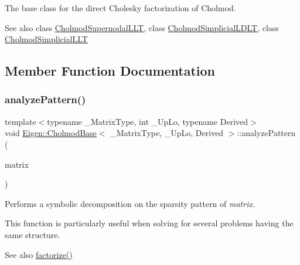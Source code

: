 The base class for the direct Cholesky factorization of Cholmod. 

\begin{DoxySeeAlso}{See also}
class \mbox{\hyperlink{class_eigen_1_1_cholmod_supernodal_l_l_t}{Cholmod\+Supernodal\+L\+LT}}, class \mbox{\hyperlink{class_eigen_1_1_cholmod_simplicial_l_d_l_t}{Cholmod\+Simplicial\+L\+D\+LT}}, class \mbox{\hyperlink{class_eigen_1_1_cholmod_simplicial_l_l_t}{Cholmod\+Simplicial\+L\+LT}} 
\end{DoxySeeAlso}


\subsection{Member Function Documentation}
\mbox{\label{class_eigen_1_1_cholmod_base_a5ac967e9f4ccfc43ca9e610b89232c24}} 
\subsubsection{\texorpdfstring{analyzePattern()}{analyzePattern()}}
{\footnotesize\ttfamily template$<$typename \+\_\+\+Matrix\+Type, int \+\_\+\+Up\+Lo, typename Derived$>$ \\
void \mbox{\hyperlink{class_eigen_1_1_cholmod_base}{Eigen\+::\+Cholmod\+Base}}$<$ \+\_\+\+Matrix\+Type, \+\_\+\+Up\+Lo, Derived $>$\+::analyze\+Pattern (\begin{DoxyParamCaption}\item[{const Matrix\+Type \&}]{matrix }\end{DoxyParamCaption})\hspace{0.3cm}{\ttfamily [inline]}}

Performs a symbolic decomposition on the sparsity pattern of {\itshape matrix}.

This function is particularly useful when solving for several problems having the same structure.

\begin{DoxySeeAlso}{See also}
\mbox{\hyperlink{class_eigen_1_1_cholmod_base_a5bd9c9ec4d1c15f202a6c66b5e9ef37b}{factorize()}} 
\end{DoxySeeAlso}
\mbox{\label{class_eigen_1_1_cholmod_base_a6a85bf52d6aa480240a64f277d7f96c6}} 
